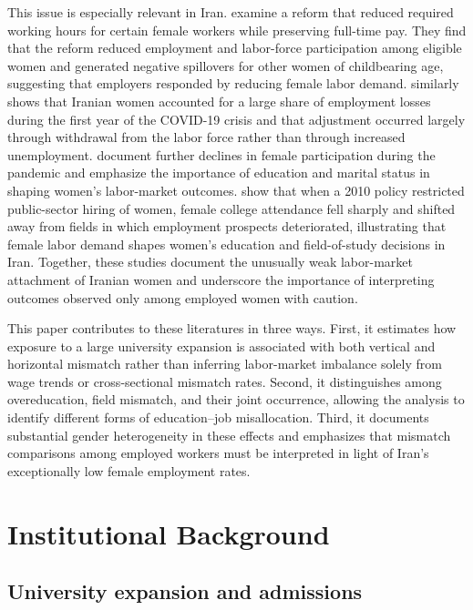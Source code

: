 This issue is especially relevant in Iran. \citet{chen2023} examine a reform that reduced required working hours for certain female workers while preserving full-time pay. They find that the reform reduced employment and labor-force participation among eligible women and generated negative spillovers for other women of childbearing age, suggesting that employers responded by reducing female labor demand. \citet{redaelli2024} similarly shows that Iranian women accounted for a large share of employment losses during the first year of the COVID-19 crisis and that adjustment occurred largely through withdrawal from the labor force rather than through increased unemployment. \citet{dang2024} document further declines in female participation during the pandemic and emphasize the importance of education and marital status in shaping women's labor-market outcomes. \citet{moeeni2023} show that when a 2010 policy restricted public-sector hiring of women, female college attendance fell sharply and shifted away from fields in which employment prospects deteriorated, illustrating that female labor demand shapes women's education and field-of-study decisions in Iran. Together, these studies document the unusually weak labor-market attachment of Iranian women and underscore the importance of interpreting outcomes observed only among employed women with caution.

This paper contributes to these literatures in three ways. First, it estimates how exposure to a large university expansion is associated with both vertical and horizontal mismatch rather than inferring labor-market imbalance solely from wage trends or cross-sectional mismatch rates. Second, it distinguishes among overeducation, field mismatch, and their joint occurrence, allowing the analysis to identify different forms of education--job misallocation. Third, it documents substantial gender heterogeneity in these effects and emphasizes that mismatch comparisons among employed workers must be interpreted in light of Iran's exceptionally low female employment rates.

\section{Institutional Background}
\label{sec:background}

\subsection{University expansion and admissions}

